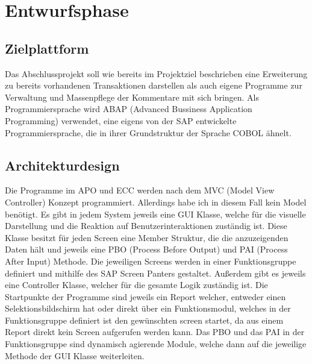\section{Entwurfsphase} 
\label{sec:Entwurfsphase}

\subsection{Zielplattform}
\label{sec:Zielplattform}
Das Abschlussprojekt soll wie bereits im Projektziel beschrieben eine Erweiterung zu bereits vorhandenen Transaktionen darstellen als auch eigene Programme zur Verwaltung und Massenpflege der Kommentare mit sich bringen. Als Programmiersprache wird ABAP (Advanced Bussiness Application Programming) verwendet, eine eigens von der SAP entwickelte Programmiersprache, die in ihrer Grundstruktur der Sprache COBOL ähnelt.

\subsection{Architekturdesign}
\label{sec:Architekturdesign}
Die Programme im APO und ECC werden nach dem MVC (Model View Controller) Konzept programmiert. Allerdings habe ich in diesem Fall kein Model benötigt. Es gibt in jedem System jeweils eine GUI Klasse, welche für die visuelle Darstellung und die Reaktion auf Benutzerinteraktionen zuständig ist. Diese Klasse besitzt für jeden Screen eine Member Struktur, die die anzuzeigenden Daten hält und jeweils eine PBO (Process Before Output) und PAI (Process After Input) Methode. Die jeweiligen Screens werden in einer Funktionsgruppe definiert und mithilfe des SAP Screen Panters gestaltet. Außerdem gibt es jeweils eine Controller Klasse, welcher für die gesamte Logik zuständig ist. Die Startpunkte der Programme sind jeweils ein Report welcher, entweder einen Selektionsbildschirm hat oder direkt über ein Funktionsmodul, welches in der Funktionsgruppe definiert ist den gewünschten screen startet, da aus einem Report direkt kein Screen aufgerufen werden kann. Das PBO und das PAI in der Funktionsgruppe sind dynamisch agierende Module, welche dann auf die jeweilige Methode der GUI Klasse weiterleiten.


